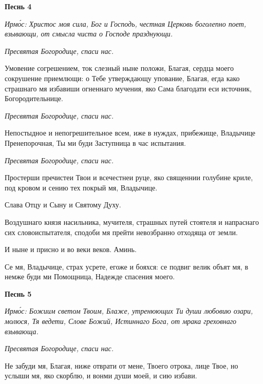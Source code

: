  

\bfseries Песнь 4\normalfont{}


 \itshape Ирмо́с:\normalfont{} Христос моя сила, Бог и Господь, честная Церковь боголепно поет,
взывающи, от смысла чиста о Господе празднующи.



 \itshape  Пресвятая Богородице, спаси нас.

\normalfont{}


   Умовение согрешением, ток слезный ныне положи, Благая, сердца моего
сокрушение приемлющи: о Тебе утверждающу упование, Благая, егда како
страшнаго мя избавиши огненнаго мучения, яко Сама благодати еси
источник, Богородительнице.



 \itshape  Пресвятая Богородице, спаси нас.
\normalfont{}


   Непостыдное и непогрешительное всем, иже в нуждах, прибежище,
Владычице Пренепорочная, Ты ми буди Заступница в час испытания.



 \itshape  Пресвятая Богородице, спаси нас.
\normalfont{}


   Простерши пречистеи Твои и всечестнеи руце, яко священнии голубине
криле, под кровом и сению тех покрый мя, Владычице.



   Слава Отцу и Сыну и Святому Духу.



   Воздушнаго князя насильника, мучителя, страшных путей стоятеля и
напраснаго сих словоиспытателя, сподоби мя прейти невозбранно отходяща
от земли.



   И ныне и присно и во веки веков. Аминь.



   Се мя, Владычице, страх усрете, егоже и бояхся: се подвиг велик объят
мя, в немже буди ми Помощница, Надежде спасения моего.



 

\bfseries Песнь 5\normalfont{}


 \itshape Ирмо́с:\normalfont{} Божиим светом Твоим, Блаже, утренюющих Ти души любовию озари,
молюся, Тя ведети, Слове Божий, Истиннаго Бога, от мрака греховнаго
взывающа.



 \itshape  Пресвятая Богородице, спаси нас.
\normalfont{}


   Не забуди мя, Благая, ниже отврати от мене, Твоего отрока, лице Твое,
но услыши мя, яко скорблю, и вонми души моей, и сию избави.



